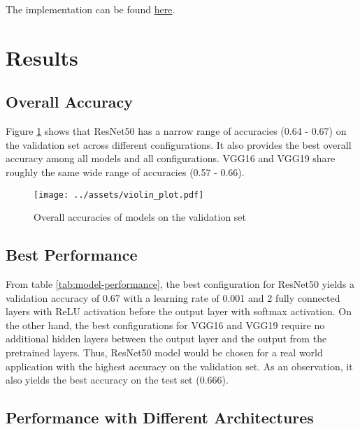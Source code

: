 \documentclass[10pt,twocolumn,letterpaper]{article}
\begin{document}
The implementation can be found \href{https://github.com/wvjgsuhp/deep-learning-fundamentals-ass-2}{here}.

\section{Results}

\subsection{Overall Accuracy}

Figure \ref{fig:overall-performance} shows that ResNet50 has a narrow range of accuracies (0.64 - 0.67) on the
validation set across different configurations. It also provides the best overall accuracy among all models and
all configurations. VGG16 and VGG19 share roughly the same wide range of accuracies (0.57 - 0.66).
\begin{figure}[!ht]
  \centering
  \texttt{[image: ../assets/violin\_plot.pdf]}
  \caption{Overall accuracies of models on the validation set}
  \label{fig:overall-performance}
\end{figure}

\subsection{Best Performance}

From table \ref{tab:model-performance}, the best configuration for ResNet50 yields a validation accuracy of 0.67
with a learning rate of 0.001 and 2 fully connected layers with ReLU activation before the output layer with
softmax activation. On the other hand, the best configurations for VGG16 and VGG19 require no additional hidden
layers between the output layer and the output from the pretrained layers. Thus, ResNet50 model would be chosen
for a real world application with the highest accuracy on the validation set. As an observation, it also yields
the best accuracy on the test set (0.666).

\subsection{Performance with Different Architectures}
\end{document}
